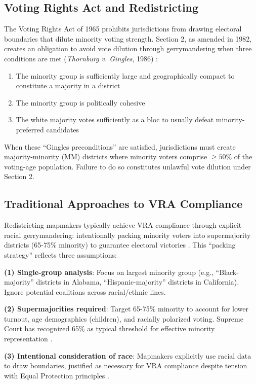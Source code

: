 \subsection{Voting Rights Act and Redistricting}

The Voting Rights Act of 1965 prohibits jurisdictions from drawing electoral boundaries that dilute minority voting strength. Section 2, as amended in 1982, creates an obligation to avoid vote dilution through gerrymandering when three conditions are met (\textit{Thornburg v. Gingles}, 1986) \citep{thornburg1986}:

\begin{enumerate}
\item The minority group is sufficiently large and geographically compact to constitute a majority in a district
\item The minority group is politically cohesive
\item The white majority votes sufficiently as a bloc to usually defeat minority-preferred candidates
\end{enumerate}

When these ``Gingles preconditions'' are satisfied, jurisdictions must create majority-minority (MM) districts where minority voters comprise $\geq 50\%$ of the voting-age population. Failure to do so constitutes unlawful vote dilution under Section 2.

\subsection{Traditional Approaches to VRA Compliance}

Redistricting mapmakers typically achieve VRA compliance through explicit racial gerrymandering: intentionally packing minority voters into supermajority districts (65-75\% minority) to guarantee electoral victories \citep{grofman1992}. This ``packing strategy'' reflects three assumptions:

\textbf{(1) Single-group analysis}: Focus on largest minority group (e.g., ``Black-majority'' districts in Alabama, ``Hispanic-majority'' districts in California). Ignore potential coalitions across racial/ethnic lines.

\textbf{(2) Supermajorities required}: Target 65-75\% minority to account for lower turnout, age demographics (children), and racially polarized voting. Supreme Court has recognized 65\% as typical threshold for effective minority representation \citep{johnson2001}.

\textbf{(3) Intentional consideration of race}: Mapmakers explicitly use racial data to draw boundaries, justified as necessary for VRA compliance despite tension with Equal Protection principles \citep{shaw1993}.

